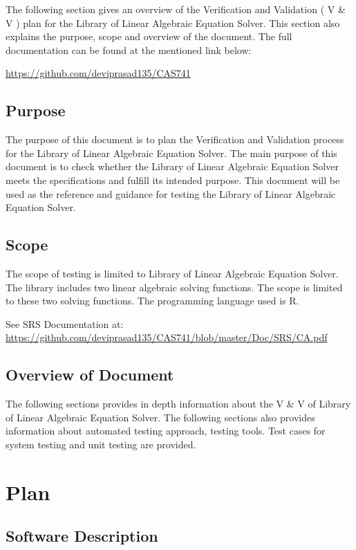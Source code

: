 \documentclass[12pt, titlepage]{article}
\begin{document}
The following section gives an overview of the Verification and Validation ( V
\& V ) plan for the Library of Linear Algebraic Equation Solver. This section
also explains the purpose, scope and overview of the document. The full documentation can be found at the mentioned link below:

\url{https://github.com/deviprasad135/CAS741}

\subsection{Purpose}

The purpose of this document is to plan the Verification and Validation process
for the Library of Linear Algebraic Equation Solver. The main purpose of this
document is to check whether the Library of Linear Algebraic Equation Solver
meets the specifications and fulfill its intended purpose. This document will be
used as the reference and guidance for testing the Library of Linear Algebraic
Equation Solver.




\subsection{Scope}

The scope of testing is limited to Library of Linear Algebraic Equation Solver.
The library includes two linear algebraic solving functions. The scope is
limited to these two solving functions. The programming language used is R. 

See SRS Documentation at:  \url{https://github.com/deviprasad135/CAS741/blob/master/Doc/SRS/CA.pdf}


\subsection{Overview of Document}

The following sections provides in depth information about the V \& V of Library
of Linear Algebraic Equation Solver. The following sections also provides
information about automated testing approach, testing tools. Test cases for
system testing and unit testing are provided.

\section{Plan}
	
\subsection{Software Description}
\end{document}
